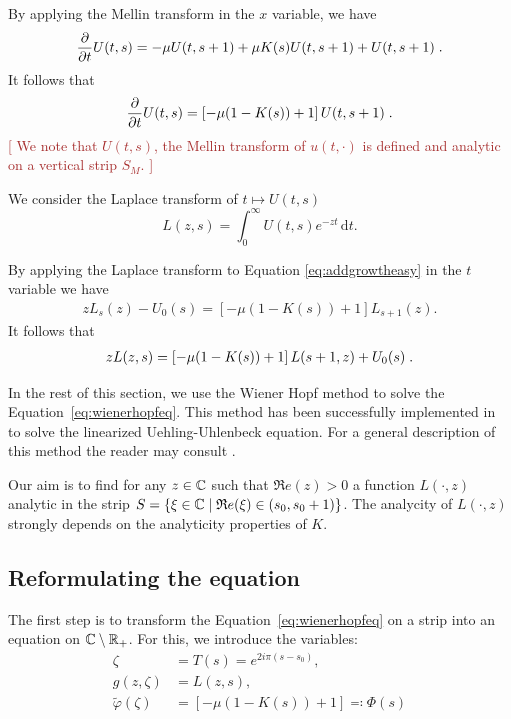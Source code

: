 \documentclass[11pt]{amsart}
\renewcommand{\Re}{\mathfrak{R}e}
\newcommand{\diff}{\,\mathrm{d}}
\newcommand{\ndr}[1]{\textcolor{brown}{[#1]}}
\begin{document}
By applying the Mellin transform in the $x$ variable, we have
	\begin{equation*}
		\frac{\partial}{\partial t} U(t,s) = - \mu U(t,s+1) + \mu K(s) U(t,s+1) + U(t,s+1)
		\; .
	\end{equation*}
It follows that
    \begin{equation}
        \frac{\partial}{\partial t} U(t,s) = \left[- \mu (1-K(s)) + 1\right] U(t,s+1)
		\; .
        \label{eq:addgrowtheasy}
    \end{equation}
    \ndr{
We note that $U(t,s)$, the Mellin transform of $u(t,\cdot)$ is defined and analytic on a vertical strip $S_M$. }

We consider the Laplace transform of $t \mapsto U(t,s)$
$$ L(z,s) = \int_0^\infty U(t,s)e^{-zt}\diff t.$$ 

By applying the Laplace transform to Equation \eqref{eq:addgrowtheasy} in the $t$ variable we have 
\begin{align*}
    zL_s(z) - U_0(s) = \left[- \mu (1-K(s)) + 1\right] L_{s+1}(z).
\end{align*}
It follows that 
\begin{align}
    \label{eq:wienerhopfeq}
    zL(z,s) = \left[- \mu (1-K(s)) + 1\right] L(s+1,z) + U_0(s)
    \; .
\end{align} 


In the rest of this section, we use the Wiener Hopf method to solve the Equation~\eqref{eq:wienerhopfeq}. This method has been successfully implemented in \cite{escobedo2007fundamental} to solve the linearized Uehling-Uhlenbeck equation. For a general description of this method the reader may consult \cite{zakharov2012kolmogorov}. 
\medskip

Our aim is to find for any $z \in \mathbb{C}$ such that $\Re(z) > 0$ a function $L(\cdot,z)$ analytic in the strip $S = \{\xi \in \CC \mid \Re(\xi) \in (s_0, s_0+1)\}$. 
The analycity of $L(\cdot,z)$ strongly depends on the analyticity properties of $K$.\\



\subsection{Reformulating the equation}\mbox{}

The first step is to transform the Equation~\eqref{eq:wienerhopfeq} on a strip into an equation on $\mathbb{C} \setminus \mathbb{R}_+$. For this, we introduce the variables:
    \begin{align}
        \zeta &= T(s) = e^{2i\pi(s-s_0)}, \label{def:zeta}\\
        g(z,\zeta) &= L(z,s), \label{def:g} \\
        \tilde \varphi(\zeta) &= \left[- \mu (1-K(s)) + 1\right] \eqqcolon 
        \Phi(s)
        \label{def:Phi}
    \end{align}
\end{document}
